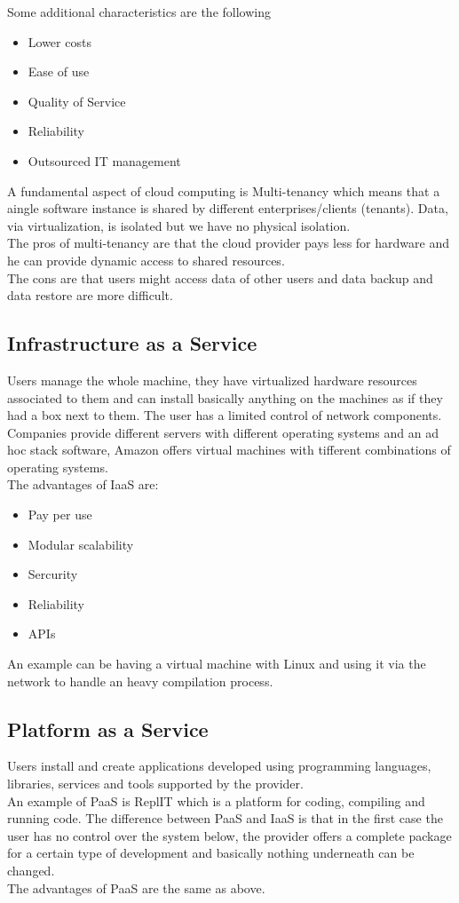 Some additional characteristics are the following
\begin{itemize}
    \item Lower costs
    \item Ease of use
    \item Quality of Service
    \item Reliability
    \item Outsourced IT management
\end{itemize}
A fundamental aspect of cloud computing is Multi-tenancy which means that a aingle software instance is shared by different enterprises/clients (tenants). Data, via virtualization, is isolated but we have no physical isolation. \\
The pros of multi-tenancy are that the cloud provider pays less for hardware and he can provide dynamic access to shared resources. \\
The cons are that users might access data of other users and data backup and data restore are more difficult.
\subsection{Infrastructure as a Service}
Users manage the whole machine, they have virtualized hardware resources associated to them and can install basically anything on the machines as if they had a box next to them. The user has a limited control of network components. \\
Companies provide different servers with different operating systems and an ad hoc stack software, Amazon offers virtual machines with tifferent combinations of operating systems. \\
The advantages of IaaS are:
\begin{itemize}
    \item Pay per use
    \item Modular scalability
    \item Sercurity
    \item Reliability
    \item APIs
\end{itemize}
An example can be having a virtual machine with Linux and using it via the network to handle an heavy compilation process.
\subsection{Platform as a Service}
Users install and create applications developed using programming languages, libraries, services and tools supported by the provider. \\
An example of PaaS is ReplIT which is a platform for coding, compiling and running code. The difference between PaaS and IaaS is that in the first case the user has no control over the system below, the provider offers a complete package for a certain type of development and basically nothing underneath can be changed. \\
The advantages of PaaS are the same as above.
